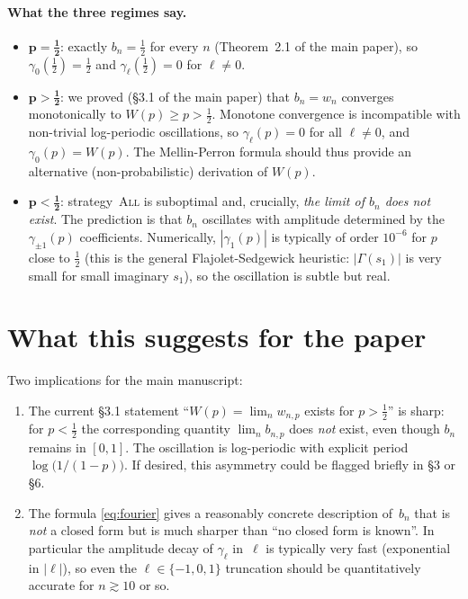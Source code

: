 \documentclass[11pt]{article}
\theoremstyle{definition}
\newcommand{\All}{\textsc{All}}
\begin{document}
\paragraph{What the three regimes say.}
\begin{itemize}[leftmargin=2em]
  \item $\boldsymbol{p=\tfrac12}$: exactly $b_n=\tfrac12$ for every $n$
    (Theorem~2.1 of the main paper), so $\gamma_0(\tfrac12)=\tfrac12$
    and $\gamma_\ell(\tfrac12)=0$ for $\ell\ne 0$.
  \item $\boldsymbol{p>\tfrac12}$: we proved (\S3.1 of the main paper)
    that $b_n=w_n$ converges monotonically to $W(p)\ge p>\tfrac12$.
    Monotone convergence is incompatible with non-trivial log-periodic
    oscillations, so $\gamma_\ell(p)=0$ for all $\ell\ne 0$, and
    $\gamma_0(p)=W(p)$. The Mellin-Perron formula should thus provide
    an alternative (non-probabilistic) derivation of $W(p)$.
  \item $\boldsymbol{p<\tfrac12}$: strategy~\All{} is suboptimal and,
    crucially, \emph{the limit of $b_n$ does not exist}. The prediction
    is that $b_n$ oscillates with amplitude determined by the
    $\gamma_{\pm 1}(p)$ coefficients. Numerically, $|\gamma_1(p)|$ is
    typically of order $10^{-6}$ for $p$ close to $\tfrac12$ (this is
    the general Flajolet-Sedgewick heuristic: $|\Gamma(s_1)|$ is very
    small for small imaginary $s_1$), so the oscillation is subtle but
    real.
\end{itemize}

\section{What this suggests for the paper}

Two implications for the main manuscript:
\begin{enumerate}[leftmargin=2em]
  \item The current \S3.1 statement ``$W(p)=\lim_n w_{n,p}$ exists for
    $p>\tfrac12$'' is sharp: for $p<\tfrac12$ the corresponding quantity
    $\lim_n b_{n,p}$ does \emph{not} exist, even though $b_n$ remains in
    $[0,1]$. The oscillation is log-periodic with explicit period
    $\log\bigl(1/(1-p)\bigr)$. If desired, this asymmetry could be
    flagged briefly in \S3 or \S6.
  \item The formula \eqref{eq:fourier} gives a reasonably concrete
    description of~$b_n$ that is \emph{not} a closed form but is much
    sharper than ``no closed form is known''. In particular the
    amplitude decay of $\gamma_\ell$ in~$\ell$ is typically very fast
    (exponential in $|\ell|$), so even the $\ell\in\{-1,0,1\}$
    truncation should be quantitatively accurate for $n\gtrsim 10$ or
    so.
\end{enumerate}
\end{document}

